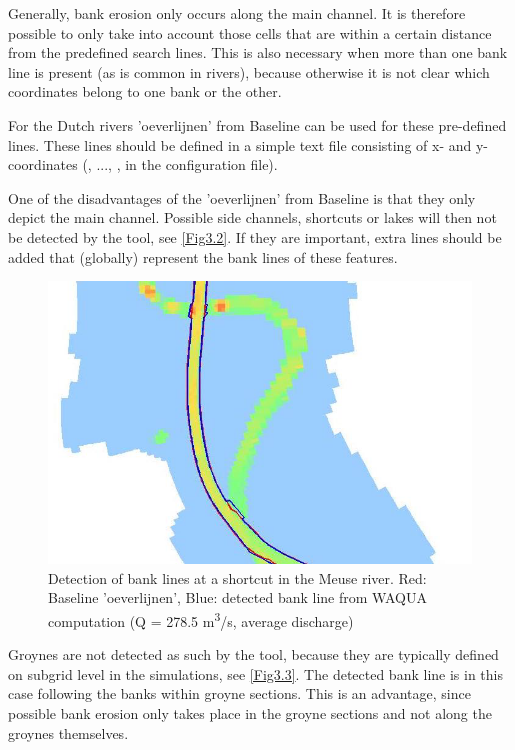 Generally, bank erosion only occurs along the main channel.
It is therefore possible to only take into account those cells that are within a certain distance from the predefined search lines.
This is also necessary when more than one bank line is present (as is common in rivers), because otherwise it is not clear which coordinates belong to one bank or the other.

For the Dutch rivers 'oeverlijnen' from Baseline can be used for these pre-defined lines.
These lines should be defined in a simple text file consisting of x- and y- coordinates (, ..., , in the configuration file).

One of the disadvantages of the 'oeverlijnen' from Baseline is that they only depict the main channel.
Possible side channels, shortcuts or lakes will then not be detected by the tool, see \autoref{Fig3.2}.
If they are important, extra lines should be added that (globally) represent the bank lines of these features.

\begin{figure}
\includegraphics[width=\textwidth]{figures/Fig3-2.png}
\caption{Detection of bank lines at a shortcut in the Meuse river.
Red: Baseline 'oeverlijnen', Blue: detected bank line from WAQUA computation (Q = 278.5 m\textsuperscript{3}/s, average discharge)}
\label{Fig3.2}
\end{figure}

Groynes are not detected as such by the tool, because they are typically defined on subgrid level in the simulations, see \autoref{Fig3.3}.
The detected bank line is in this case following the banks within groyne sections.
This is an advantage, since possible bank erosion only takes place in the groyne sections and not along the groynes themselves.

